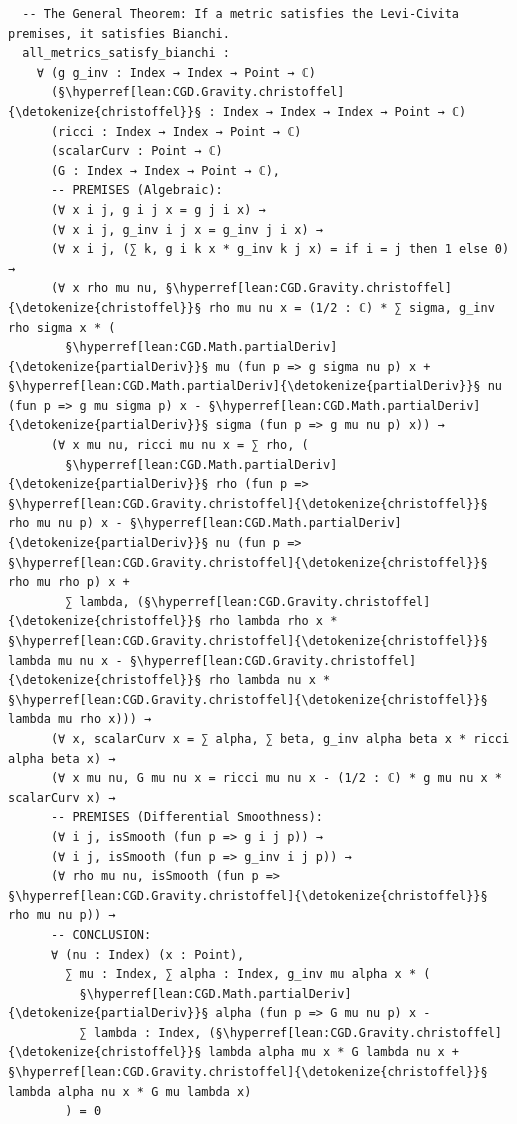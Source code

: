 \begin{verbatim}
  -- The General Theorem: If a metric satisfies the Levi-Civita premises, it satisfies Bianchi.
  all_metrics_satisfy_bianchi :
    ∀ (g g_inv : Index → Index → Point → ℂ)
      (§\hyperref[lean:CGD.Gravity.christoffel]{\detokenize{christoffel}}§ : Index → Index → Index → Point → ℂ)
      (ricci : Index → Index → Point → ℂ)
      (scalarCurv : Point → ℂ)
      (G : Index → Index → Point → ℂ),
      -- PREMISES (Algebraic):
      (∀ x i j, g i j x = g j i x) →
      (∀ x i j, g_inv i j x = g_inv j i x) →
      (∀ x i j, (∑ k, g i k x * g_inv k j x) = if i = j then 1 else 0) →
      (∀ x rho mu nu, §\hyperref[lean:CGD.Gravity.christoffel]{\detokenize{christoffel}}§ rho mu nu x = (1/2 : ℂ) * ∑ sigma, g_inv rho sigma x * (
        §\hyperref[lean:CGD.Math.partialDeriv]{\detokenize{partialDeriv}}§ mu (fun p => g sigma nu p) x + §\hyperref[lean:CGD.Math.partialDeriv]{\detokenize{partialDeriv}}§ nu (fun p => g mu sigma p) x - §\hyperref[lean:CGD.Math.partialDeriv]{\detokenize{partialDeriv}}§ sigma (fun p => g mu nu p) x)) →
      (∀ x mu nu, ricci mu nu x = ∑ rho, (
        §\hyperref[lean:CGD.Math.partialDeriv]{\detokenize{partialDeriv}}§ rho (fun p => §\hyperref[lean:CGD.Gravity.christoffel]{\detokenize{christoffel}}§ rho mu nu p) x - §\hyperref[lean:CGD.Math.partialDeriv]{\detokenize{partialDeriv}}§ nu (fun p => §\hyperref[lean:CGD.Gravity.christoffel]{\detokenize{christoffel}}§ rho mu rho p) x + 
        ∑ lambda, (§\hyperref[lean:CGD.Gravity.christoffel]{\detokenize{christoffel}}§ rho lambda rho x * §\hyperref[lean:CGD.Gravity.christoffel]{\detokenize{christoffel}}§ lambda mu nu x - §\hyperref[lean:CGD.Gravity.christoffel]{\detokenize{christoffel}}§ rho lambda nu x * §\hyperref[lean:CGD.Gravity.christoffel]{\detokenize{christoffel}}§ lambda mu rho x))) →
      (∀ x, scalarCurv x = ∑ alpha, ∑ beta, g_inv alpha beta x * ricci alpha beta x) →
      (∀ x mu nu, G mu nu x = ricci mu nu x - (1/2 : ℂ) * g mu nu x * scalarCurv x) →
      -- PREMISES (Differential Smoothness):
      (∀ i j, isSmooth (fun p => g i j p)) →
      (∀ i j, isSmooth (fun p => g_inv i j p)) →
      (∀ rho mu nu, isSmooth (fun p => §\hyperref[lean:CGD.Gravity.christoffel]{\detokenize{christoffel}}§ rho mu nu p)) →
      -- CONCLUSION:
      ∀ (nu : Index) (x : Point),
        ∑ mu : Index, ∑ alpha : Index, g_inv mu alpha x * (
          §\hyperref[lean:CGD.Math.partialDeriv]{\detokenize{partialDeriv}}§ alpha (fun p => G mu nu p) x -
          ∑ lambda : Index, (§\hyperref[lean:CGD.Gravity.christoffel]{\detokenize{christoffel}}§ lambda alpha mu x * G lambda nu x + §\hyperref[lean:CGD.Gravity.christoffel]{\detokenize{christoffel}}§ lambda alpha nu x * G mu lambda x)
        ) = 0



\end{verbatim}
